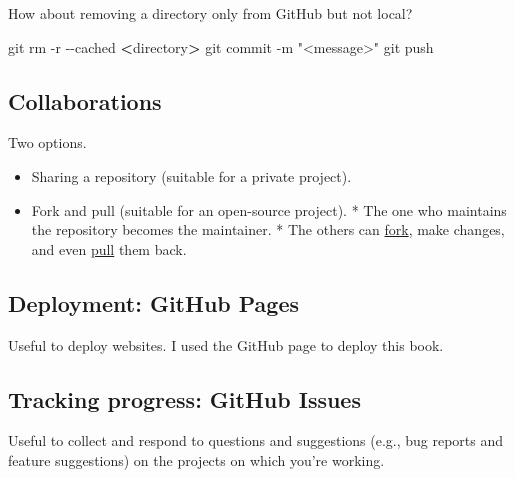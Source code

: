 \documentclass[
]{book}
\newenvironment{Shaded}{\begin{snugshade}}{\end{snugshade}}
\newcommand{\FunctionTok}[1]{\textcolor[rgb]{0.00,0.00,0.00}{#1}}
\newcommand{\NormalTok}[1]{#1}
\newcommand{\OperatorTok}[1]{\textcolor[rgb]{0.81,0.36,0.00}{\textbf{#1}}}
\newcommand{\StringTok}[1]{\textcolor[rgb]{0.31,0.60,0.02}{#1}}
\providecommand{\tightlist}{%
  \setlength{\itemsep}{0pt}\setlength{\parskip}{0pt}}
\begin{document}
How about removing a directory only from GitHub but not local?

\begin{Shaded}
\begin{Highlighting}[]
\FunctionTok{git}\NormalTok{ rm {-}r {-}{-}cached }\OperatorTok{\textless{}}\NormalTok{directory}\OperatorTok{\textgreater{}}
\FunctionTok{git}\NormalTok{ commit {-}m }\StringTok{"\textless{}message\textgreater{}"}
\FunctionTok{git}\NormalTok{ push}
\end{Highlighting}
\end{Shaded}

\hypertarget{collaborations}{%
\subsection{Collaborations}\label{collaborations}}

Two options.

\begin{itemize}
\tightlist
\item
  Sharing a repository (suitable for a private project).
\item
  Fork and pull (suitable for an open-source project).
  \hspace{0pt} * The one who maintains the repository becomes the maintainer.
  \hspace{0pt} * The others can \href{https://help.GitHub.com/articles/about-forks/}{fork}, make changes, and even \href{https://help.GitHub.com/articles/about-pull-requests/}{pull} them back.
\end{itemize}

\hypertarget{deployment-github-pages}{%
\subsection{Deployment: GitHub Pages}\label{deployment-github-pages}}

Useful to deploy websites. I used the GitHub page to deploy this book.

\hypertarget{tracking-progress-github-issues}{%
\subsection{Tracking progress: GitHub Issues}\label{tracking-progress-github-issues}}

Useful to collect and respond to questions and suggestions (e.g., bug reports and feature suggestions) on the projects on which you're working.
\end{document}
